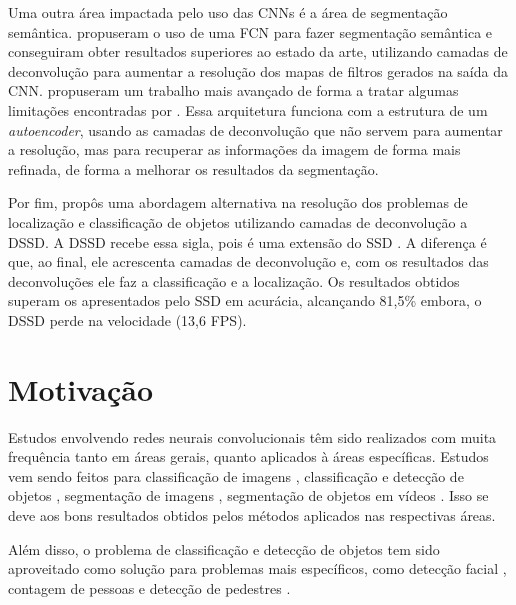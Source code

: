 Uma outra área impactada pelo uso das \ac{CNN}s é a área de segmentação semântica.  propuseram o uso de uma \ac{FCN} para fazer segmentação semântica e conseguiram obter resultados superiores ao estado da arte, utilizando camadas de deconvolução para aumentar a resolução dos mapas de filtros gerados na saída da \ac{CNN}.  propuseram um trabalho mais avançado de forma a tratar algumas limitações encontradas por . Essa arquitetura funciona com a estrutura de um \textit{autoencoder}, usando as camadas de deconvolução que não servem para aumentar a resolução, mas para recuperar as informações da imagem de forma mais refinada, de forma a melhorar os resultados da segmentação.

Por fim,  propôs uma abordagem alternativa na resolução dos problemas de localização e classificação de objetos utilizando camadas de deconvolução a \ac{DSSD}. A \ac{DSSD} recebe essa sigla, pois é uma extensão do \ac{SSD} \cite{wei-2015}. A diferença é que, ao final, ele acrescenta camadas de deconvolução e, com os resultados das deconvoluções ele faz a classificação e a localização. Os resultados obtidos superam os apresentados pelo \ac{SSD} em acurácia, alcançando 81,5\% embora, o  \ac{DSSD} perde na velocidade (13,6 FPS). 

\section{Motivação}
\label{secao:1:1}

Estudos envolvendo redes neurais convolucionais têm sido realizados com muita frequência tanto em áreas gerais, quanto aplicados à áreas específicas. Estudos vem sendo feitos para classificação de imagens \cite{krizhevsky-2012, simonyan-2014}, classificação e detecção de objetos , segmentação de imagens , segmentação de objetos em vídeos . Isso se deve aos bons resultados obtidos pelos métodos aplicados nas respectivas áreas.

Além disso, o problema de classificação e detecção de objetos tem sido aproveitado como solução para problemas mais específicos, como detecção facial \cite{yang-2018}, contagem de pessoas \cite{pren-2017} e detecção de pedestres \cite{lan-2018}. 

